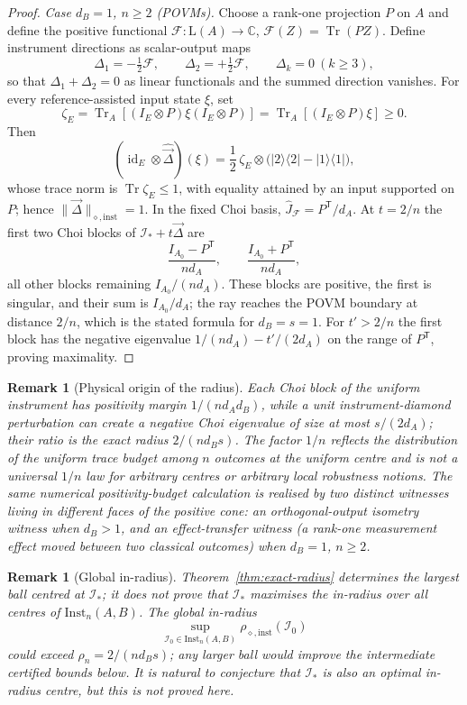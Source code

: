 \documentclass[11pt,a4paper]{article}
\newtheorem{remark}[theorem]{Remark}
\newcommand{\Lin}{\mathrm{L}}
\newcommand{\Inst}{\mathrm{Inst}}
\newcommand{\Tr}{\operatorname{Tr}}
\newcommand{\id}{\operatorname{id}}
\newcommand{\Jhat}{\widehat J}
\newcommand{\vD}{\vec{\Delta}}
\begin{document}
\begin{proof}
\emph{Case $d_B=1$, $n\ge2$ (POVMs).} Choose a rank-one projection $P$ on $A$ and define the positive functional $\mathcal F:\Lin(A)\to\mathbb C$, $\mathcal F(Z)=\Tr(PZ)$. Define instrument directions as scalar-output maps
\[
\Delta_1=-\tfrac12\mathcal F,\qquad \Delta_2=+\tfrac12\mathcal F,\qquad \Delta_k=0\ (k\ge3),
\]
so that $\Delta_1+\Delta_2=0$ as linear functionals and the summed direction vanishes. For every reference-assisted input state $\xi$, set
\[
\zeta_E=\Tr_A[(I_E\otimes P)\xi(I_E\otimes P)]=\Tr_A[(I_E\otimes P)\xi]\ge0.
\]
Then
\[
(\id_E\otimes\widehat{\vD})(\xi)
=\frac12\,\zeta_E\otimes\big(|2\rangle\langle2|-|1\rangle\langle1|\big),
\]
whose trace norm is $\Tr\zeta_E\le1$, with equality attained by an input supported on $P$; hence $\|\vD\|_{\diamond,\mathrm{inst}}=1$. In the fixed Choi basis, $\Jhat_{\mathcal F}=P^{\mathsf T}/d_A$. At $t=2/n$ the first two Choi blocks of $\mathcal I_*+t\vD$ are
\[
\frac{I_{A_0}-P^{\mathsf T}}{nd_A},\qquad
\frac{I_{A_0}+P^{\mathsf T}}{nd_A},
\]
all other blocks remaining $I_{A_0}/(nd_A)$. These blocks are positive, the first is singular, and their sum is $I_{A_0}/d_A$; the ray reaches the POVM boundary at distance $2/n$, which is the stated formula for $d_B=s=1$. For $t'>2/n$ the first block has the negative eigenvalue $1/(nd_A)-t'/(2d_A)$ on the range of $P^{\mathsf T}$, proving maximality.
\end{proof}

\begin{remark}[Physical origin of the radius]
\label{rem:physical-origin}
Each Choi block of the uniform instrument has positivity margin $1/(nd_Ad_B)$, while a unit instrument-diamond perturbation can create a negative Choi eigenvalue of size at most $s/(2d_A)$; their ratio is the exact radius $2/(nd_Bs)$. The factor $1/n$ reflects the distribution of the uniform trace budget among $n$ outcomes \emph{at the uniform centre} and is not a universal $1/n$ law for arbitrary centres or arbitrary local robustness notions. The same numerical positivity-budget calculation is realised by two \emph{distinct} witnesses living in different faces of the positive cone: an orthogonal-output isometry witness when $d_B>1$, and an effect-transfer witness (a rank-one measurement effect moved between two classical outcomes) when $d_B=1$, $n\ge2$.
\end{remark}

\begin{remark}[Global in-radius]
\label{rem:global-inradius}
Theorem~\ref{thm:exact-radius} determines the largest ball centred at $\mathcal I_*$; it does not prove that $\mathcal I_*$ maximises the in-radius over all centres of $\Inst_n(A,B)$. The global in-radius
\[
\sup_{\mathcal I_0\in\Inst_n(A,B)}\rho_{\diamond,\mathrm{inst}}(\mathcal I_0)
\]
could exceed $\rho_n=2/(nd_Bs)$; any larger ball would improve the intermediate certified bounds below. It is natural to conjecture that $\mathcal I_*$ is also an optimal in-radius centre, but this is not proved here.
\end{remark}
\end{document}
